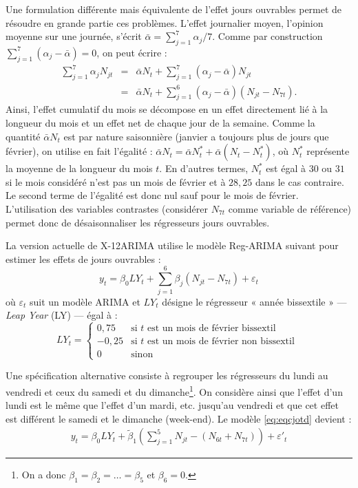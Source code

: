 \documentclass[11pt,french,french]{article}
\let\rmarkdownfootnote\footnote%
\def\footnote{\protect\rmarkdownfootnote}
\begin{document}
Une formulation différente mais équivalente de l'effet jours ouvrables permet de résoudre en grande partie ces problèmes.
L'effet journalier moyen, l'opinion moyenne sur une journée, s'écrit \(\bar{\alpha} = \sum_{j=1}^7 \alpha_j /7\).
Comme par construction \(\sum_{j=1}^7 \left(\alpha_j-\bar{\alpha}\right) = 0\), on peut écrire :
\begin{eqnarray*}
\sum_{j=1}^7 \alpha_j N_{jt} & = & \bar{\alpha}N_t + \sum_{j=1}^7 \left(\alpha_j-\bar{\alpha}\right) N_{jt} \nonumber \\
& = &  \bar{\alpha}N_t + \sum_{j=1}^6 \left(\alpha_j-\bar{\alpha}\right) \left(N_{jt} - N_{7t}\right).
\end{eqnarray*}
Ainsi, l'effet cumulatif du mois se décompose en un effet directement lié à la longueur du mois et un effet net de chaque jour de la semaine.
Comme la quantité \(\bar{\alpha}N_t\) est par nature saisonnière (janvier a toujours plus de jours que février), on utilise en fait l'égalité : \(\bar{\alpha}N_t = \bar{\alpha}N_t^* + \bar{\alpha}\left(N_t-N_t^*\right)\), où \(N_t^*\)
représente la moyenne de la longueur du mois \(t\).
En d'autres termes, \(N_t^*\) est égal à \(30\) ou \(31\) si le mois considéré n'est pas un mois de février et à \(28,25\) dans le cas contraire.
Le second terme de l'égalité est donc nul sauf pour le mois de février.
L'utilisation des variables contrastes (considérer \(N_{7t}\) comme variable de référence) permet donc de désaisonnaliser les régresseurs jours ouvrables.

La version actuelle de X-12ARIMA utilise le modèle Reg-ARIMA suivant pour estimer les effets de jours ouvrables :
\begin{equation}
y_t=\beta_0 LY_t + \sum_{j=1}^{6} \beta_j \left(N_{jt} - N_{7t}\right) + \varepsilon_t
    \label{eq:eqcjotd}
\end{equation}
où \(\varepsilon_t\) suit un modèle ARIMA et \(LY_t\) désigne le régresseur « année bissextile » --- \emph{Leap Year} (LY) --- égal à :
\[
LY_{t} = \left\{ \begin{array}{rl} 
                0,75 & \mbox{si } t \mbox{ est un mois de février bissextil } \\
                -0,25 & \mbox{si } t \mbox{ est un mois de février non bissextil } \\
                0 & \mbox{sinon}
               \end{array}
         \right.
\]

Une spécification alternative consiste à regrouper les régresseurs du lundi au vendredi et ceux du samedi et du dimanche\footnote{On a donc \(\beta_1=\beta_2=\dots=\beta_5\) et \(\beta_6 = 0\).}.
On considère ainsi que l'effet d'un lundi est le même que l'effet d'un mardi, etc. jusqu'au vendredi et que cet effet est différent le samedi et le dimanche (week-end). Le modèle \eqref{eq:eqcjotd} devient :
\begin{eqnarray}
y_t=\beta_0 LY_t + \tilde\beta_1 \left(\sum_{j=1}^{5}N_{jt} - (N_{6t} + N_{7t})\right) + \varepsilon'_t
\label{eq:eqcjowd}
\end{eqnarray}
\end{document}
